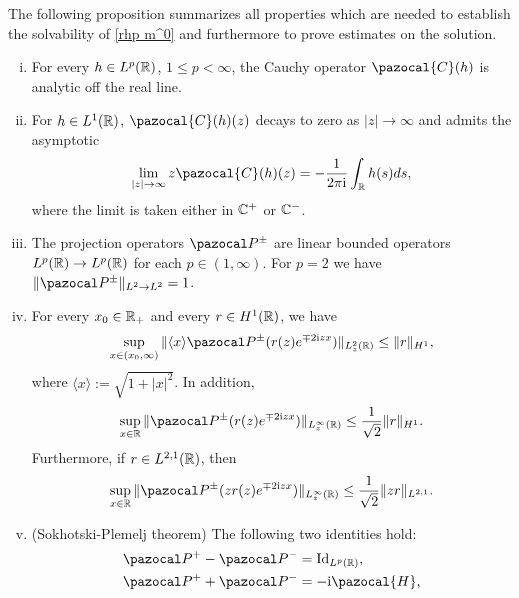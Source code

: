 The following proposition summarizes all properties which are needed to establish the solvability of \rh \ref{rhp m^0} and furthermore to prove estimates on the solution.
\begin{prop}\label{p cauchy operator}
    \begin{enumerate}[(i)]
      \item For every $h\in L^p(\mathbb R)$, $1\leq p<\infty$, the Cauchy operator $\pazocal{C}(h)$ is analytic off the real line.
      \item For $h\in L^1(\mathbb R)$, $\pazocal{C}(h)(z)$ decays to zero as $|z|\to\infty$ and admits the asymptotic
          \begin{equation}\label{e lim z Ch(z)}
            \lim_{|z|\to\infty}z\pazocal{C}(h)(z)= -\frac{1}{2\pi\ii}\int_\Real h(s) ds,
          \end{equation}
          where the limit is taken either in $\mathbb C^+$ or $\mathbb C^-$.
      \item The projection operators $\Ppm$ are linear bounded operators $L^p(\mathbb R)\to L^p(\mathbb R)$ for each $p\in(1,\infty)$. For $p=2$ we have $\|\Ppm\|_{L^2\to L^2}=1$.
      \item For every $x_0\in\mathbb R_+$ and every $r\in H^1(\mathbb R)$, we have
          \begin{equation}\label{e sup P^pm r 1}
              \sup_{x\in(x_0,\infty)} \|\langle x\rangle\Ppm (r(z)e^{\mp2\ii zx})\|_{L^{2}_z(\Real)}\leq \|r\|_{H^1},
          \end{equation}
          where $\langle x\rangle:=\sqrt{1+|x|^2}$. In addition,
          \begin{equation}\label{e sup P^pm r 2}
              \sup_{x\in\Real} \|\Ppm (r(z)e^{\mp2\ii zx})\|_{L^{\infty}_z(\Real)}\leq \frac{1}{\sqrt{2}}\|r\|_{H^1}.
          \end{equation}
          Furthermore, if $r\in L^{2,1}(\mathbb R)$, then
          \begin{equation}\label{e sup P^pm r 3}
              \sup_{x\in\Real}\|\Ppm (zr(z)e^{\mp2\ii zx})\|_{L^{\infty}_z(\Real)}\leq \frac{1}{\sqrt{2}}\|zr\|_{L^{2,1}}.
          \end{equation}
      \item (Sokhotski-Plemelj theorem) The following two identities hold:
      \begin{equation}\label{e Sokhotski-Plemelj}
        \begin{aligned}
            &\Pp-\Pm=\text{Id}_{L^p(\Real)},\\
            &\Pp+\Pm=-\ii\pazocal{H},

\end{aligned}
\end{equation}
\end{enumerate}
\end{prop}
